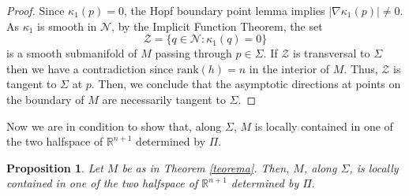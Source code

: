 \documentclass[11pt]{amsart}
\theoremstyle{plain}
\newtheorem{proposition}[theorem]{Proposition}
\numberwithin{equation}{section}
\numberwithin{theorem}{section}
\begin{document}
\begin{proof}
Since $\kappa_1(p)=0$, the Hopf boundary point lemma implies $|\nabla \kappa_1(p)|\neq 0$. As $\kappa_1$ is smooth in $\mathcal{N}$, by the Implicit Function Theorem, the set \[
\mathcal Z=\{q\in\mathcal{N} : \kappa_1(q)=0\}
\]
is a smooth submanifold of $M$ passing through $p\in \Sigma$. If $\mathcal Z$ is transversal to $\Sigma$ then we have a contradiction since $\textrm{rank}(h)=n$ in the interior of $M$. Thus, $\mathcal Z$ is tangent to $\Sigma$ at $p$. Then, we conclude  that the asymptotic directions at points on the boundary of $M$ are necessarily tangent to $\Sigma$.
\end{proof}




Now we are in condition to show that, along $\Sigma$,  $M$ is locally contained in one of the two halfspace of $\mathbb{R}^{n+1}$ determined by $\Pi.$ 


\begin{proposition}
	\label{lema2}
	Let $M$ be as in Theorem \ref{teorema}.  Then, $M$, along $\Sigma$, is locally contained in one of the two halfspace of $\mathbb{R}^{n+1}$ determined by $\Pi.$ 
	\end{proposition}
\end{document}
